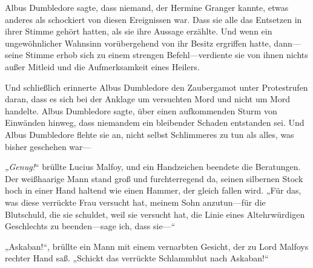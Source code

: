 Albus Dumbledore sagte, dass niemand, der Hermine Granger kannte, etwas anderes als schockiert von diesen Ereignissen war. Dass sie alle das Entsetzen in ihrer Stimme gehört hatten, als sie ihre Aussage erzählte. Und wenn ein ungewöhnlicher Wahnsinn vorübergehend von ihr Besitz ergriffen hatte, dann—seine Stimme erhob sich zu einem strengen Befehl—verdiente sie von ihnen nichts außer Mitleid und die Aufmerksamkeit eines Heilers.

Und schließlich erinnerte Albus Dumbledore den Zaubergamot unter Protestrufen daran, dass es sich bei der Anklage um versuchten Mord und nicht um Mord handelte. Albus Dumbledore sagte, über einen aufkommenden Sturm von Einwänden hinweg, dass niemandem ein bleibender Schaden entstanden sei. Und Albus Dumbledore flehte sie an, nicht selbst Schlimmeres zu tun als alles, was bisher geschehen war—

\emph{„Genug!}“ brüllte Lucius Malfoy, und ein Handzeichen beendete die Beratungen. Der weißhaarige Mann stand groß und furchterregend da, seinen silbernen Stock hoch in einer Hand haltend wie einen Hammer, der gleich fallen wird. „Für das, was diese verrückte Frau versucht hat, meinem Sohn anzutun—für die Blutschuld, die sie schuldet, weil sie versucht hat, die Linie eines Altehrwürdigen Geschlechts zu beenden—sage ich, dass sie—“

„Askaban!“, brüllte ein Mann mit einem vernarbten Gesicht, der zu Lord Malfoys rechter Hand saß. „Schickt das verrückte Schlammblut nach Askaban!“

